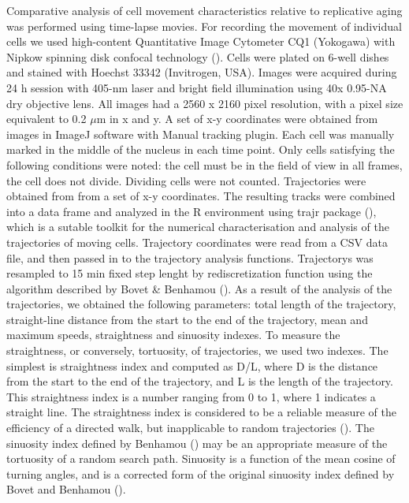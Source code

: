 \documentclass[english,authoryear]{elsarticle}
\begin{document}
Comparative analysis of cell movement characteristics relative to replicative aging was performed using time-lapse movies.
For recording the movement of individual cells we used high-content Quantitative Image Cytometer CQ1 (Yokogawa) with Nipkow spinning disk confocal technology (\cite{sakashita2015cq1}).
Cells were plated on 6-well dishes and stained with Hoechst 33342 (Invitrogen, USA).
Images were acquired during 24 h session with 405-nm laser and bright field illumination using 40x 0.95-NA dry objective lens.
All images had a 2560 x 2160 pixel resolution, with a pixel size equivalent to 0.2 $\mu$m in x and y.
A set of x-y coordinates were obtained from images in ImageJ software with Manual tracking plugin.
Each cell was manually marked in the middle of the nucleus in each time point.
Only cells satisfying the following conditions were noted: the cell must be in the field of view in all frames, the cell does not divide.
Dividing cells were not counted.
Trajectories were obtained from from a set of x-y coordinates.
The resulting tracks were combined into a data frame and analyzed in the R environment using trajr package (\cite{mclean2018trajr}), which is a sutable toolkit for the numerical characterisation and analysis of the trajectories of moving cells.
Trajectory coordinates were read from a CSV data file, and then passed in to the trajectory analysis functions.
Trajectorys was resampled to 15 min fixed step lenght by rediscretization function using the algorithm described by Bovet & Benhamou (\cite{bovet1988spatial}).
As a result of the analysis of the trajectories, we obtained the following parameters: total length of the trajectory, straight-line distance from the start to the end of the trajectory, mean and maximum speeds, straightness and sinuosity indexes.
To measure the straightness, or conversely, tortuosity, of trajectories, we used two indexes.
The simplest is straightness index and computed as D/L, where D is the distance from the start to the end of the trajectory, and L is the length of the trajectory.
This straightness index is a number ranging from 0 to 1, where 1 indicates a straight line.
The straightness index is considered to be a reliable measure of the efficiency of a directed walk, but inapplicable to random trajectories (\cite{benhamou2006detecting}).
The sinuosity index defined by Benhamou (\cite{benhamou2004reliably}) may be an appropriate measure of the tortuosity of a random search path.
Sinuosity is a function of the mean cosine of turning angles, and is a corrected form of the original sinuosity index defined by Bovet and Benhamou (\cite{bovet1988spatial}).
\end{document}
